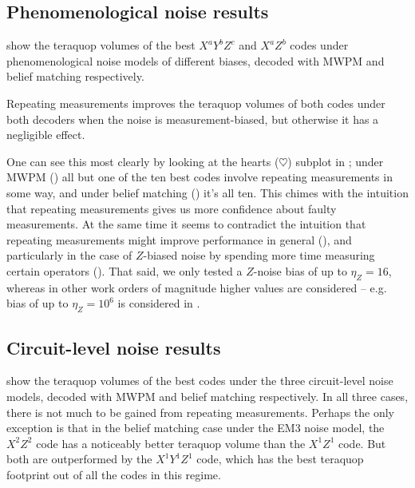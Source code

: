 \subsection{Phenomenological noise results}\label{subsec:repeating_measurements_phenomenological_noise}

 show the teraquop volumes of the best $X^a Y^b Z^c$ and $X^a Z^b$ codes under phenomenological noise models of different biases, decoded with MWPM and belief matching respectively.

\begin{keypoint}
    Repeating measurements improves the teraquop volumes of both codes under both decoders when the noise is measurement-biased, but otherwise it has a negligible effect.
\end{keypoint}

One can see this most clearly by looking at the hearts ($\heartsuit$) subplot in ;
under MWPM () all but one of the ten best codes involve repeating measurements in some way,
and under belief matching () it's all ten.
This chimes with the intuition that repeating measurements gives us more confidence about faulty measurements.
At the same time it seems to contradict the intuition that repeating measurements might improve performance in general (), and particularly in the case of $Z$-biased noise by spending more time measuring certain operators (). That said, we only tested a $Z$-noise bias of up to $\eta_Z = 16$, whereas in other work orders of magnitude higher values are considered -- e.g. bias of up to $\eta_Z = 10^6$ is considered in .

\subsection{Circuit-level noise results}\label{subsec:repeating_measurements_circuit_level_noise}

 show the teraquop volumes of the best codes under the three circuit-level noise models, decoded with MWPM and belief matching respectively.
In all three cases, there is not much to be gained from repeating measurements.
Perhaps the only exception is that in the belief matching case under the EM3 noise model, the $X^2 Z^2$ code has a noticeably better teraquop volume than the $X^1 Z^1$ code.
But both are outperformed by the $X^1 Y^1 Z^1$ code, which has the best teraquop footprint out of all the codes in this regime.

